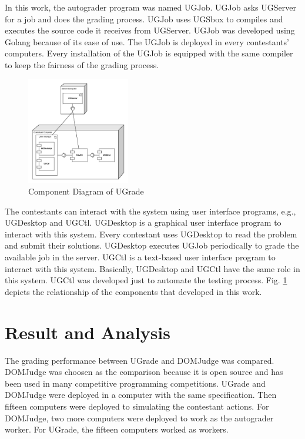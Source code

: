 \documentclass[conference,a4paper]{IEEEtran}
\begin{document}
In this work, the autograder program was named UGJob. UGJob asks UGServer for a job and does the grading process. UGJob uses UGSbox to compiles and executes the source code it receives from UGServer. UGJob was developed using Golang because of its ease of use. The UGJob is deployed in every contestants' computers. Every installation of the UGJob is equipped with the same compiler to keep the fairness of the grading process.

\begin{figure}[htbp]
\centerline{\includegraphics[width=0.4\textwidth]{images/paper-component.jpeg}}
\caption{Component Diagram of UGrade}
\label{component}
\end{figure}

The contestants can interact with the system using user interface programs, e.g., UGDesktop and UGCtl. UGDesktop is a graphical user interface program to interact with this system. Every contestant uses UGDesktop to read the problem and submit their solutions. UGDesktop executes UGJob periodically to grade the available job in the server. UGCtl is a text-based user interface program to interact with this system. Basically, UGDesktop and UGCtl have the same role in this system. UGCtl was developed just to automate the testing process. Fig. \ref{component} depicts the relationship of the components that developed in this work.

\section{Result and Analysis}

The grading performance between UGrade and DOMJudge was compared. DOMJudge was choosen as the comparison because it is open source and has been used in many competitive programming competitions. UGrade and DOMJudge were deployed in a computer with the same specification. Then fifteen computers were deployed to simulating the contestant actions. For DOMJudge, two more computers were deployed to work as the autograder worker. For UGrade, the fifteen computers worked as workers.
\end{document}
